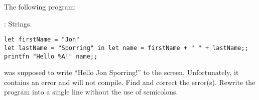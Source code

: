 The following program:
  \begin{codeNOutput}{: Strings.}
\begin{lstlisting}
let firstName = "Jon"
let lastName = "Sporring" in let name = firstName + " " + lastName;;
printfn "Hello %A!" name;;
\end{lstlisting}
\end{codeNOutput}
was supposed to write ``Hello Jon Sporring!'' to the
screen. Unfortunately, it contains an error and will not compile. Find
and correct the error(s). Rewrite the program into a single line without
the use of semicolons.